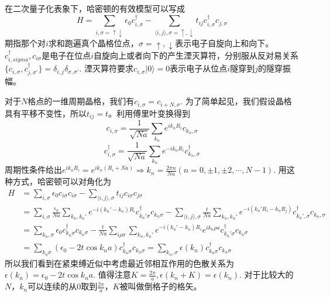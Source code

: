 \documentclass{article}
\numberwithin{equation}{subsection}
\begin{document}
在二次量子化表象下，哈密顿的有效模型可以写成
\begin{equation}
    H=\sum_{i,\sigma=\uparrow\downarrow}\epsilon_0c_{i,\sigma}^\dagger-\sum_{\langle i,j\rangle,\sigma=\uparrow,\downarrow}t_{ij}c_{i,\sigma}^\dagger c_{j,\sigma}
\end{equation}
期指那个对$i$求和跑遍真个晶格位点，$\sigma=\uparrow,\downarrow$表示电子自旋向上和向下。$c_{i,sigma}^\dagger,c_{i\sigma}$是电子在位点$i$自旋向上或者向下的产生湮灭算符，分别服从反对易关系$\{c_{i,\sigma},c_{j,\sigma'}^\dagger\}=\delta_{i,j}\delta_{\sigma,\sigma'}$. 湮灭算符要求$c_{i,\sigma}|0\rangle=0$表示电子从位点$i$隧穿到$j$的隧穿振幅。

对于$N$格点的一维周期晶格，我们有$c_{i,\sigma}=c_{i+N,\sigma}$. 为了简单起见，我们假设晶格具有平移不变性，所以$t_{ij}=t$。利用傅里叶变换得到
\begin{equation}
    c_{i,\sigma}=\frac{1}{\sqrt{Na}}\sum_{k_n}e^{ik_n R_i}c_{k_n,\sigma}
\end{equation}
\begin{equation}
    c_{i,\sigma}^\dagger=\frac{1}{\sqrt{Na}}\sum_{k_n}e^{-ik_n R_i}c_{k_n,\sigma}^\dagger
\end{equation}
周期性条件给出$e^{ik_nR_i}=e^{ik_n(R_i+Na)}\Rightarrow k_n=\frac{2\pi n}{Na}(n=0,\pm1,\pm2,\cdots,N-1)$. 用这种方式，哈密顿可以对角化为
\begin{equation}
    \begin{split}
        H&=\sum_{i,\sigma}\epsilon_0c_{i\sigma}c_{i\sigma}-\sum_{\langle i,j\rangle,\sigma}t_{ij}c_{i\sigma}c_{j\sigma}\\
        &=\sum_{i,\sigma}\frac{\epsilon_0}{Na}\sum_{k_n,k_n'}e^{-i(k_n'-k_n)R_i}c_{k_n'\sigma}^\dagger c_{k_n\sigma}-\sum_{\langle i,j\rangle,\sigma}\frac{t}{Na}\sum_{k_n,k_n'}e^{-i(k_n'R_i-k_nR_j)}c_{k_n',\sigma}^\dagger c_{k_n,\sigma}\\
        &=\sum_{k_n,\sigma}\epsilon_0c_{k_n\sigma}^\dagger c_{k_n\sigma}-\frac{t}{Na}\sum_{i\rho\sigma}\sum_{k_n,k_n'}e^{-i(k_n'-k_n)R_i}e^{ik_n\rho a}c_{k_n'\sigma}^\dagger c_{k_n\sigma}\\
        &=\sum_{k_n\sigma}(\epsilon_0-2t\cos k_n a)c_{k_n\sigma}^\dagger c_{k_n\sigma}=\sum_{k_n,\sigma}\epsilon(k_n)c_{k_n\sigma}^\dagger c_{k_n\sigma}
    \end{split}
\end{equation}
所以我们看到在紧束缚近似中考虑最近邻相互作用的色散关系为$\epsilon(k_n)=\epsilon_0-2t\cos k_na$. 值得注意$K=\frac{2\pi}{a},\epsilon(k_n+K)=\epsilon(k_n)$. 对于比较大的$N$，$k_n$可以连续的从$0$取到$\frac{2\pi}{a}$，$K$被叫做倒格子的格矢。
\end{document}
